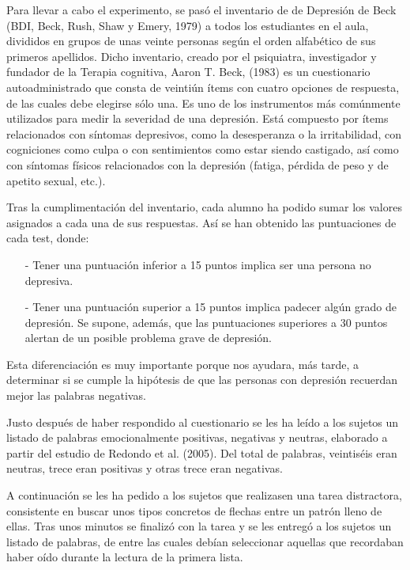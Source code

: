 \documentclass[a4paper,11pt]{article}
\begin{document}
Para llevar a cabo el experimento, se pasó el inventario de de Depresión de Beck (BDI, Beck, Rush, Shaw y Emery, 1979) a todos los estudiantes en el aula, divididos en grupos de unas veinte personas según el orden alfabético de sus primeros apellidos. Dicho inventario, creado por el psiquiatra, investigador y fundador de la Terapia cognitiva, Aaron T. Beck, (1983) es un cuestionario autoadministrado que consta de veintiún ítems con cuatro opciones de respuesta, de las cuales debe elegirse sólo una. Es uno de los instrumentos más comúnmente utilizados para medir la severidad de una depresión. Está compuesto por ítems relacionados con síntomas depresivos, como la desesperanza o la irritabilidad, con cogniciones como culpa o con sentimientos como estar siendo castigado, así como con síntomas físicos relacionados con la depresión (fatiga, pérdida de peso y de apetito sexual, etc.).
 
Tras la cumplimentación del inventario, cada alumno ha podido sumar los valores asignados a cada una de sus respuestas. Así se han obtenido las puntuaciones de cada test, donde:
\begin{itemize}
	\item[-] Tener una puntuación inferior a 15 puntos implica ser una persona no depresiva.
	\item[-] Tener una puntuación superior a 15 puntos implica padecer algún grado de depresión. Se
	supone, además, que las puntuaciones superiores a 30 puntos alertan de un posible problema grave
	de depresión.
\end{itemize}

Esta diferenciación es muy importante porque nos ayudara, más tarde, a determinar si se cumple la hipótesis de que las personas con depresión recuerdan mejor las palabras negativas.

Justo después de haber respondido al cuestionario se les ha leído a los sujetos un listado de palabras emocionalmente positivas, negativas y neutras, elaborado a partir del estudio de Redondo et al. (2005). Del total de palabras, veintiséis eran neutras, trece eran positivas y otras trece eran negativas.

A continuación se les ha pedido a los sujetos que realizasen una tarea distractora, consistente en buscar unos tipos concretos de flechas entre un patrón lleno de ellas. Tras unos minutos se finalizó con la tarea y se les entregó a los sujetos un listado de palabras, de entre las cuales debían seleccionar aquellas que recordaban haber oído durante la lectura de la primera lista.
\end{document}
